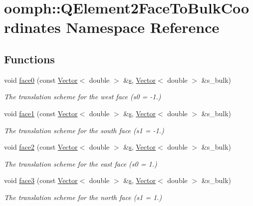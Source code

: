 \hypertarget{namespaceoomph_1_1QElement2FaceToBulkCoordinates}{}\section{oomph\+:\+:Q\+Element2\+Face\+To\+Bulk\+Coordinates Namespace Reference}
\label{namespaceoomph_1_1QElement2FaceToBulkCoordinates}
\subsection*{Functions}
\begin{DoxyCompactItemize}
\item 
void \hyperlink{namespaceoomph_1_1QElement2FaceToBulkCoordinates_a4c5f3ae98dff82f924d0423db0e64d1c}{face0} (const \hyperlink{classoomph_1_1Vector}{Vector}$<$ double $>$ \&\hyperlink{cfortran_8h_ab7123126e4885ef647dd9c6e3807a21c}{s}, \hyperlink{classoomph_1_1Vector}{Vector}$<$ double $>$ \&s\+\_\+bulk)
\begin{DoxyCompactList}\small\item\em The translation scheme for the west face (s0 = -\/1.) \end{DoxyCompactList}\item 
void \hyperlink{namespaceoomph_1_1QElement2FaceToBulkCoordinates_a437c520840c087a1e181a808b169ad7a}{face1} (const \hyperlink{classoomph_1_1Vector}{Vector}$<$ double $>$ \&\hyperlink{cfortran_8h_ab7123126e4885ef647dd9c6e3807a21c}{s}, \hyperlink{classoomph_1_1Vector}{Vector}$<$ double $>$ \&s\+\_\+bulk)
\begin{DoxyCompactList}\small\item\em The translation scheme for the south face (s1 = -\/1.) \end{DoxyCompactList}\item 
void \hyperlink{namespaceoomph_1_1QElement2FaceToBulkCoordinates_a1c978f59cbaabaf63b65480667712840}{face2} (const \hyperlink{classoomph_1_1Vector}{Vector}$<$ double $>$ \&\hyperlink{cfortran_8h_ab7123126e4885ef647dd9c6e3807a21c}{s}, \hyperlink{classoomph_1_1Vector}{Vector}$<$ double $>$ \&s\+\_\+bulk)
\begin{DoxyCompactList}\small\item\em The translation scheme for the east face (s0 = 1.) \end{DoxyCompactList}\item 
void \hyperlink{namespaceoomph_1_1QElement2FaceToBulkCoordinates_af032c8455c159191a98f1b3b64212b9a}{face3} (const \hyperlink{classoomph_1_1Vector}{Vector}$<$ double $>$ \&\hyperlink{cfortran_8h_ab7123126e4885ef647dd9c6e3807a21c}{s}, \hyperlink{classoomph_1_1Vector}{Vector}$<$ double $>$ \&s\+\_\+bulk)
\begin{DoxyCompactList}\small\item\em The translation scheme for the north face (s1 = 1.) \end{DoxyCompactList}\end{DoxyCompactItemize}


